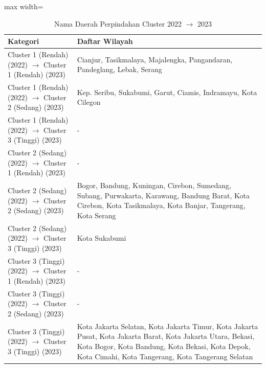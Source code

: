 \begin{table}[H]
\centering
\caption{Nama Daerah Perpindahan Cluster 2022 \(\rightarrow\) 2023} \label{tab:app1transname2022x2023}
\begin{adjustbox}{max width=\textwidth}
\begin{tabular}{|p{4cm}|p{10cm}|}
\hline
\textbf{Kategori} & \textbf{Daftar Wilayah} \\
\hline
Cluster 1 (Rendah) (2022) \(\rightarrow\) Cluster 1 (Rendah) (2023) & Cianjur, Tasikmalaya, Majalengka, Pangandaran, Pandeglang, Lebak, Serang \\
\hline
Cluster 1 (Rendah) (2022) \(\rightarrow\) Cluster 2 (Sedang) (2023) & Kep. Seribu, Sukabumi, Garut, Ciamis, Indramayu, Kota Cilegon \\
\hline
Cluster 1 (Rendah) (2022) \(\rightarrow\) Cluster 3 (Tinggi) (2023) & - \\
\hline
Cluster 2 (Sedang) (2022) \(\rightarrow\) Cluster 1 (Rendah) (2023) & - \\
\hline
Cluster 2 (Sedang) (2022) \(\rightarrow\) Cluster 2 (Sedang) (2023) & Bogor, Bandung, Kuningan, Cirebon, Sumedang, Subang, Purwakarta, Karawang, Bandung Barat, Kota Cirebon, Kota Tasikmalaya, Kota Banjar, Tangerang, Kota Serang \\
\hline
Cluster 2 (Sedang) (2022) \(\rightarrow\) Cluster 3 (Tinggi) (2023) & Kota Sukabumi \\
\hline
Cluster 3 (Tinggi) (2022) \(\rightarrow\) Cluster 1 (Rendah) (2023) & - \\
\hline
Cluster 3 (Tinggi) (2022) \(\rightarrow\) Cluster 2 (Sedang) (2023) & - \\
\hline
Cluster 3 (Tinggi) (2022) \(\rightarrow\) Cluster 3 (Tinggi) (2023) & Kota Jakarta Selatan, Kota Jakarta Timur, Kota Jakarta Pusat, Kota Jakarta Barat, Kota Jakarta Utara, Bekasi, Kota Bogor, Kota Bandung, Kota Bekasi, Kota Depok, Kota Cimahi, Kota Tangerang, Kota Tangerang Selatan \\
\hline
\end{tabular}
\end{adjustbox}
\end{table}
